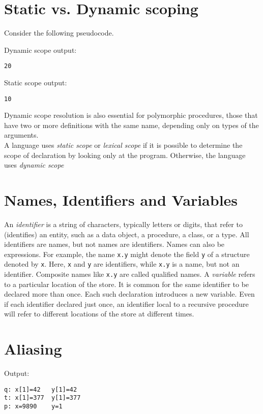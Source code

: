 \documentclass[12pt,a4paper,oneside,draft]{report}
\newcommand{\cc}[1]{\texttt{#1}}
\begin{document}
\newpage

\section*{Static vs. Dynamic scoping}

\lstset{style=clanguage}
Consider the following pseudocode.


\lstset{style=codeoutput}
\noindent Dynamic scope output:
\begin{lstlisting}
20
\end{lstlisting}

\lstset{style=codeoutput}
\noindent Static scope output:
\begin{lstlisting}
10
\end{lstlisting}

Dynamic scope resolution is also essential for polymorphic procedures, those that have two or more definitions with the same name, depending only on types of the arguments.
\\\indent A language uses \emph{static scope} or \emph{lexical scope} if it is possible to determine the scope of declaration by looking only at the program. Otherwise, the language uses \emph{dynamic scope}

\newpage

\section*{Names, Identifiers and Variables}
\indent\indent An \emph{identifier} is a string of characters, typically letters or digits, that refer to (identifies) an entity, such as a data object, a procedure, a class, or a type. All identifiers are names, but not names are identifiers. Names can also be expressions. For example, the name \cc{x.y} might denote the field \cc{y} of a structure denoted by \cc{x}. Here, \cc{x} and \cc{y} are identifiers, while \cc{x.y} is a name, but not an identifier. Composite names like \cc{x.y} are called qualified names.
\indent A \emph{variable} refers to a particular location of the store. It is common for the same identifier to be declared more than once. Each such declaration introduces a new variable. Even if each identifier declared just once, an identifier local to a recursive procedure will refer to different locations of the store at different times.

\newpage
\section*{Aliasing}
\lstset{style=clanguage}

\lstset{style=codeoutput}
Output:
\begin{lstlisting}
q: x[1]=42	 y[1]=42
t: x[1]=377	 y[1]=377
p: x=9890	 y=1
\end{lstlisting}
\end{document}
